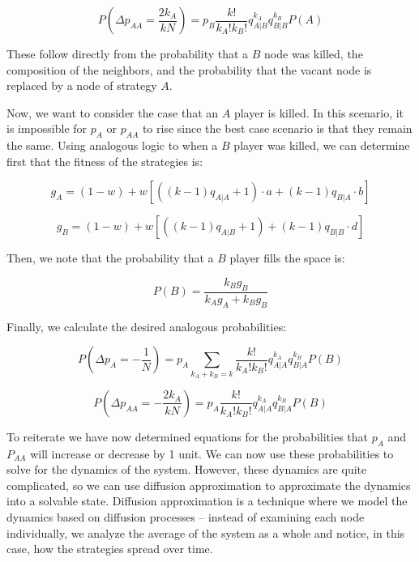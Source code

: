 \documentclass[11pt]{article}
\begin{document}
\begin{equation}
    P\left(\Delta p_{AA} = \frac{2k_A}{kN}\right) = p_B \frac{k!}{k_A!k_B!}q_{A|B}^{k_A}q_{B|B}^{k_B}P(A)
\end{equation}

These follow directly from the probability that a $B$ node was killed, the composition of the neighbors, and the probability that the vacant node is replaced by a node of strategy $A$. 

Now, we want to consider the case that an $A$ player is killed. In this scenario, it is impossible for $p_A$ or $p_{AA}$ to rise since the best case scenario is that they remain the same. Using analogous logic to when a $B$ player was killed, we can determine first that the fitness of the strategies is:

\begin{equation}
    g_A = (1 - w) + w\left[((k-1)q_{A|A} + 1) \cdot a + (k-1)q_{B|A}\cdot b \right]
\end{equation}

\begin{equation}
    g_B = (1 - w) + w\left[((k-1)q_{A|B} + 1) + (k-1)q_{B|B}\cdot d\right]
\end{equation}

Then, we note that the probability that a $B$ player fills the space is:

\begin{equation}
    P(B) = \frac{k_Bg_B}{k_Ag_A + k_B g_B}
\end{equation}

Finally, we calculate the desired analogous probabilities:

\begin{equation}
    P\left(\Delta p_A = -\frac{1}{N}\right) = p_A \sum_{k_A + k_B = k} \frac{k!}{k_A!k_B!}q_{A|A}^{k_A}q_{B|A}^{k_B}P(B)
\end{equation}

\begin{equation}
    P\left(\Delta p_{AA} = -\frac{2k_A}{kN}\right) = p_A \frac{k!}{k_A!k_B!}q_{A|A}^{k_A}q_{B|A}^{k_B}P(B)
\end{equation}

To reiterate we have now determined equations for the probabilities that $p_A$ and $P_{AA}$ will increase or decrease by 1 unit. We can now use these probabilities to solve for the dynamics of the system. However, these dynamics are quite complicated, so we can use diffusion approximation to approximate the dynamics into a solvable state. Diffusion approximation is a technique where we model the dynamics based on diffusion processes -- instead of examining each node individually, we analyze the average of the system as a whole and notice, in this case, how the strategies spread over time. 
\end{document}
